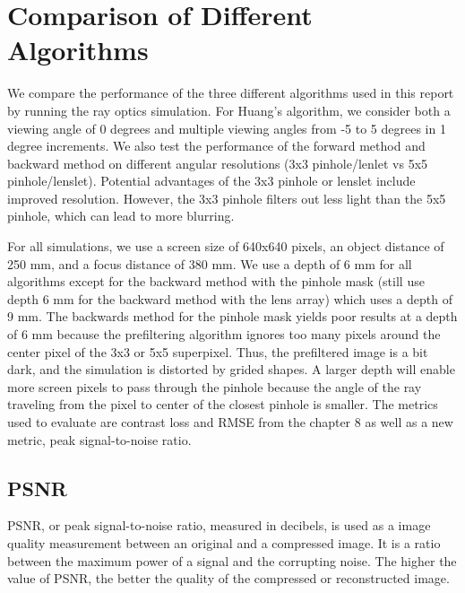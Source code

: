 \chapter{Comparison of Different Algorithms}



We compare the performance of the three different algorithms used in this report by running the ray optics simulation. For Huang's algorithm, we consider both a viewing angle of 0 degrees and multiple viewing angles from -5 to 5 degrees in 1 degree increments. We also test the performance of the forward method and backward method on different angular resolutions (3x3 pinhole/lenlet vs 5x5 pinhole/lenslet). Potential advantages of the 3x3 pinhole or lenslet include improved resolution. However, the 3x3 pinhole filters out less light than the 5x5 pinhole, which can lead to more blurring. 

For all simulations, we use a screen size of 640x640 pixels, an object distance of 250 mm, and a focus distance of 380 mm. We use a depth of 6 mm for all algorithms except for the backward method with the pinhole mask (still use depth 6 mm for the backward method with the lens array) which uses a depth of 9 mm. The backwards method for the pinhole mask yields poor results at a depth of 6 mm because the prefiltering algorithm ignores too many pixels around the center pixel of the 3x3 or 5x5 superpixel. Thus, the prefiltered image is a bit dark, and the simulation is distorted by grided shapes. A larger depth will enable more screen pixels to pass through the pinhole because the angle of the ray traveling from the pixel to center of the closest pinhole is smaller. The metrics used to evaluate are contrast loss and RMSE from the chapter 8 as well as a new metric, peak signal-to-noise ratio.

\section{PSNR}

PSNR, or peak signal-to-noise ratio, measured in decibels, is used as a image quality measurement between an original and a compressed image. It is a ratio between the maximum power of a signal and the corrupting noise. The higher the value of PSNR, the better the quality of the compressed or reconstructed image.

